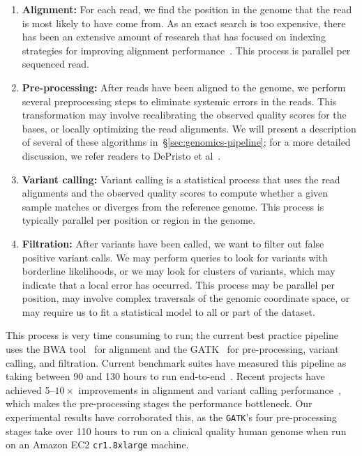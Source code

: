 \documentclass[masters]{ucbthesis}
\begin{document}
\begin{enumerate}
\item \textbf{Alignment:} For each read, we find the position in the genome that the read is most likely to
have come from. As an exact search is too expensive, there has been an extensive amount of research
that has focused on indexing strategies for improving alignment performance~\cite{li10, li11wham,
zaharia11}. This process is parallel per sequenced read.
\item \textbf{Pre-processing:} After reads have been aligned to the genome, we perform several
preprocessing steps to eliminate systemic errors in the reads. This transformation may involve recalibrating the
observed quality scores for the bases, or locally optimizing the read alignments. We will present a
description of several of these algorithms in~\S\ref{sec:genomics-pipeline}; for a more detailed
discussion, we refer readers to DePristo et al~\cite{depristo11}.
\item \textbf{Variant calling:} Variant calling is a statistical process that uses the read alignments
and the observed quality scores to compute whether a given sample matches or diverges
from the reference genome. This process is typically parallel per position or region in the genome.
\item \textbf{Filtration:} After variants have been called, we want to filter out false positive variant calls.
We may perform queries to look for variants with borderline likelihoods, or we may look for clusters of
variants, which may indicate that a local error has occurred. This process may be parallel per position,
may involve complex traversals of the genomic coordinate space, or may require us to fit a statistical
model to all or part of the dataset.
\end{enumerate}

This process is very time consuming to run; the current best practice pipeline uses the BWA
tool~\cite{li10} for alignment and the GATK~\cite{depristo11, mckenna10} for pre-processing, variant
calling, and filtration. Current benchmark suites have measured this pipeline as taking between 90 and
130 hours to run end-to-end~\cite{talwalkar14}. Recent projects have achieved 5--$10\times$
improvements in alignment and variant calling performance~\cite{rimmer14, zaharia11}, which makes the
pre-processing stages the performance bottleneck. Our experimental results have corroborated this, as
the \texttt{GATK}'s four pre-processing stages take over 110 hours to run on a clinical quality human genome when run
on an Amazon EC2 \texttt{cr1.8xlarge} machine. 
\end{document}
